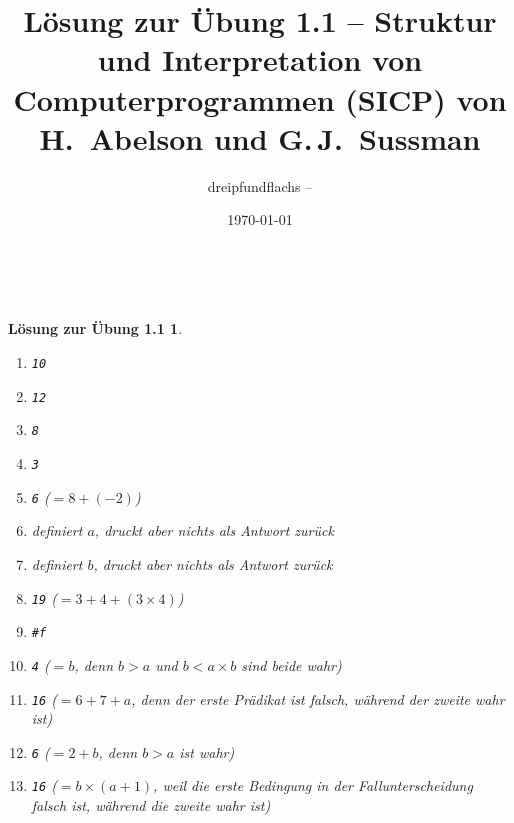 \documentclass[a4paper,11pt,reqno]{amsart}
\theoremstyle{uremark}
\newtheorem*{loes}{L\"osung zur \"Ubung 1.1}
\begin{document}
\title[]{L\"osung zur \"Ubung 1.1 -- Struktur und Interpretation von
Computerprogrammen (SICP) von H.~Abelson und G.\,J.~Sussman}
\author{dreipfundflachs --
\href{https://github.com/dreipfundflachs}{}}
\date{\today}
\maketitle
\

\begin{loes}\ 
\begin{enumerate}[label=\small$\bullet$]
    \item \texttt{10}
    \item \texttt{12}
    \item \texttt{8}
    \item \texttt{3}
    \item \texttt{6} ($ = 8  + (-2)$)
    \item definiert $ a $, druckt aber nichts als Antwort zur\"uck
    \item definiert $ b $, druckt aber nichts als Antwort zur\"uck
    \item \texttt{19} ($ = 3 + 4 + (3 \times 4) $) 
    \item \texttt{\#f}
    \item \texttt{4} ($ = b $, denn $ b > a $ und $ b < a \times b $ sind beide
            wahr)
    \item \texttt{16} ($ = 6 + 7 + a $, denn der erste Pr\"adikat ist
        falsch, w\"ahrend der zweite wahr ist)
    \item \texttt{6} ($ = 2 + b $, denn $ b > a $ ist wahr)
    \item \texttt{16} ($ = b \times (a + 1) $, weil die erste Bedingung in der
        Fallunterscheidung \ttt{cond} falsch ist, w\"ahrend die zweite wahr ist)


\end{enumerate}
\end{loes}
\end{document}

